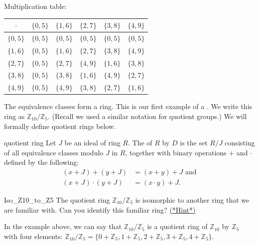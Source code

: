 \begin{example}{}
Multiplication table:

\begin{center}
\begin{tabular}{c|c|c|c|c|c}
$\cdot$ & $\{0,5\}$ & $\{1,6\}$ & $\{2,7\}$ & $\{3,8\}$ & $\{4,9\}$ \\
\hline
$\{0,5\}$ & $\{0,5\}$ & $\{0,5\}$ & $\{0,5\}$ & $\{0,5\}$ & $\{0,5\}$ \\
\hline
$\{1,6\}$ & $\{0,5\}$ & $\{1,6\}$ & $\{2,7\}$ & $\{3,8\}$ & $\{4,9\}$ \\
\hline
$\{2,7\}$ & $\{0,5\}$ & $\{2,7\}$ & $\{4,9\}$ & $\{1,6\}$ & $\{3,8\}$ \\
\hline
$\{3,8\}$ & $\{0,5\}$ & $\{3,8\}$ & $\{1,6\}$ & $\{4,9\}$ & $\{2,7\}$ \\
\hline
$\{4,9\}$ & $\{0,5\}$ & $\{4,9\}$ & $\{3,8\}$ & $\{2,7\}$ & $\{1,6\}$ \\
\end{tabular}
\end{center}
\end{example}

The equivalence classes form a ring.  This is our first example of a .  We write this ring as ${\mathbb Z}_{10}/{\mathbb Z}_5$.  (Recall we used a similar notation for quotient groups.)  We will formally define quotient rings below.

\begin{defn}{quotient ring}
Let $J$ be an ideal of ring $R$.  The  of $R$ by $D$ is the set $R/J$ consisting of all equivalence classes modulo $J$ in $R$, together with binary operations $+$ and $\cdot$ defined by the following:
\begin{align*}
(x+J)+(y+J)&=(x+y)+J \text{ and}\\
(x+J)\cdot(y+J)&=(x\cdot y)+J.
\end{align*}
\end{defn}

\begin{exercise}{Iso_Z10_to_Z5}
The quotient ring ${\mathbb Z}_{10}/{\mathbb Z}_5$ is isomorphic to another ring that we are familiar with. Can you identify this familiar ring?  \hyperref[ringsHints]{(*Hint*)} 
\end{exercise}

In the example above, we can say that ${\mathbb Z}_{10}/{\mathbb Z}_5$ is a quotient ring of ${\mathbb Z}_{10}$ by ${\mathbb Z}_5$ with four elements:
${\mathbb Z}_{10}/{\mathbb Z}_5=\{0+{\mathbb Z}_5, 1+{\mathbb Z}_5, 2+{\mathbb Z}_5, 3+{\mathbb Z}_5, 4+{\mathbb Z}_5\}$.

